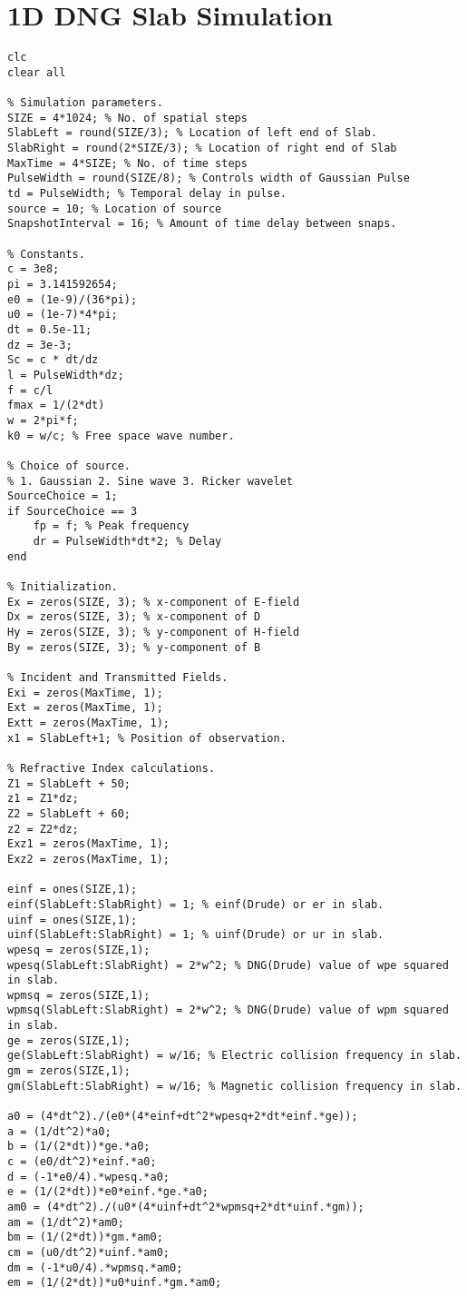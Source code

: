 \chapter{1D DNG Slab Simulation}
\begin{lstlisting}
clc
clear all

% Simulation parameters.
SIZE = 4*1024; % No. of spatial steps
SlabLeft = round(SIZE/3); % Location of left end of Slab.
SlabRight = round(2*SIZE/3); % Location of right end of Slab
MaxTime = 4*SIZE; % No. of time steps
PulseWidth = round(SIZE/8); % Controls width of Gaussian Pulse
td = PulseWidth; % Temporal delay in pulse.
source = 10; % Location of source
SnapshotInterval = 16; % Amount of time delay between snaps.

% Constants.
c = 3e8;
pi = 3.141592654;
e0 = (1e-9)/(36*pi);
u0 = (1e-7)*4*pi;
dt = 0.5e-11;
dz = 3e-3;
Sc = c * dt/dz
l = PulseWidth*dz;
f = c/l
fmax = 1/(2*dt)
w = 2*pi*f;
k0 = w/c; % Free space wave number.

% Choice of source.
% 1. Gaussian 2. Sine wave 3. Ricker wavelet
SourceChoice = 1;
if SourceChoice == 3
    fp = f; % Peak frequency
    dr = PulseWidth*dt*2; % Delay
end

% Initialization.
Ex = zeros(SIZE, 3); % x-component of E-field
Dx = zeros(SIZE, 3); % x-component of D
Hy = zeros(SIZE, 3); % y-component of H-field
By = zeros(SIZE, 3); % y-component of B

% Incident and Transmitted Fields.
Exi = zeros(MaxTime, 1);
Ext = zeros(MaxTime, 1);
Extt = zeros(MaxTime, 1);
x1 = SlabLeft+1; % Position of observation.

% Refractive Index calculations.
Z1 = SlabLeft + 50;
z1 = Z1*dz;
Z2 = SlabLeft + 60;
z2 = Z2*dz;
Exz1 = zeros(MaxTime, 1);
Exz2 = zeros(MaxTime, 1);

einf = ones(SIZE,1);
einf(SlabLeft:SlabRight) = 1; % einf(Drude) or er in slab.
uinf = ones(SIZE,1);
uinf(SlabLeft:SlabRight) = 1; % uinf(Drude) or ur in slab.
wpesq = zeros(SIZE,1);
wpesq(SlabLeft:SlabRight) = 2*w^2; % DNG(Drude) value of wpe squared in slab.
wpmsq = zeros(SIZE,1);
wpmsq(SlabLeft:SlabRight) = 2*w^2; % DNG(Drude) value of wpm squared in slab.
ge = zeros(SIZE,1);
ge(SlabLeft:SlabRight) = w/16; % Electric collision frequency in slab.
gm = zeros(SIZE,1);
gm(SlabLeft:SlabRight) = w/16; % Magnetic collision frequency in slab.

a0 = (4*dt^2)./(e0*(4*einf+dt^2*wpesq+2*dt*einf.*ge));
a = (1/dt^2)*a0;
b = (1/(2*dt))*ge.*a0;
c = (e0/dt^2)*einf.*a0;
d = (-1*e0/4).*wpesq.*a0;
e = (1/(2*dt))*e0*einf.*ge.*a0;
am0 = (4*dt^2)./(u0*(4*uinf+dt^2*wpmsq+2*dt*uinf.*gm));
am = (1/dt^2)*am0;
bm = (1/(2*dt))*gm.*am0;
cm = (u0/dt^2)*uinf.*am0;
dm = (-1*u0/4).*wpmsq.*am0;
em = (1/(2*dt))*u0*uinf.*gm.*am0;


\end{lstlisting}
